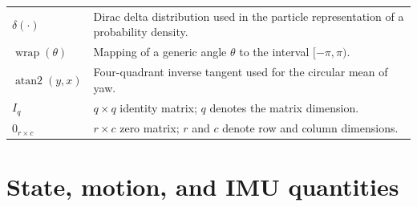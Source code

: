 \begin{longtable}{p{}p{}}
$\delta(\cdot)$ & Dirac delta distribution used in the particle representation of a probability density.\\
$\operatorname{wrap}(\theta)$ & Mapping of a generic angle $\theta$ to the interval $[-\pi,\pi)$.\\
$\operatorname{atan2}(y,x)$ & Four-quadrant inverse tangent used for the circular mean of yaw.\\
$I_q$ & $q\times q$ identity matrix; $q$ denotes the matrix dimension.\\
$0_{r\times c}$ & $r\times c$ zero matrix; $r$ and $c$ denote row and column dimensions.\\
\bottomrule
\end{longtable}

\section*{State, motion, and IMU quantities}
